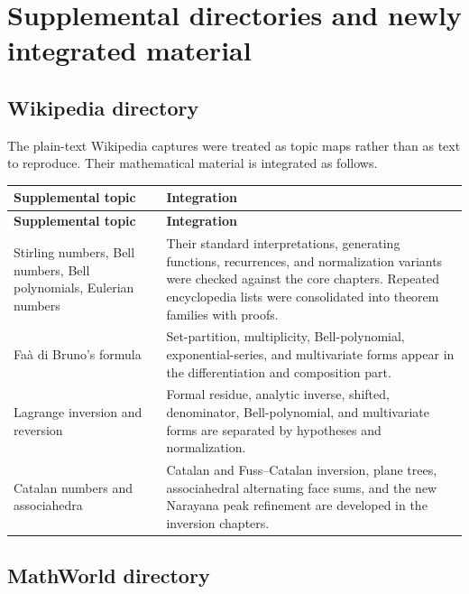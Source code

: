 \documentclass[11pt,a4paper,oneside,openany]{book}
\theoremstyle{definition}
\theoremstyle{remark}
\begin{document}
\chapter{Supplemental directories and newly integrated material}
\label{ch:supplemental-ledger}

\section{Wikipedia directory}

The plain-text Wikipedia captures were treated as topic maps rather than as
text to reproduce.  Their mathematical material is integrated as follows.

\begin{longtable}{>{\raggedright\arraybackslash}p{}
                  >{\raggedright\arraybackslash}p{}}
\toprule
\textbf{Supplemental topic} & \textbf{Integration}\\
\midrule
\endfirsthead
\toprule
\textbf{Supplemental topic} & \textbf{Integration}\\
\midrule
\endhead
\bottomrule
\endfoot
Stirling numbers, Bell numbers, Bell polynomials, Eulerian numbers
& Their standard interpretations, generating functions, recurrences, and
  normalization variants were checked against the core chapters.  Repeated
  encyclopedia lists were consolidated into theorem families with proofs.\\
Faà di Bruno's formula
& Set-partition, multiplicity, Bell-polynomial, exponential-series, and
  multivariate forms appear in the differentiation and composition part.\\
Lagrange inversion and reversion
& Formal residue, analytic inverse, shifted, denominator, Bell-polynomial, and
  multivariate forms are separated by hypotheses and normalization.\\
Catalan numbers and associahedra
& Catalan and Fuss--Catalan inversion, plane trees, associahedral alternating
  face sums, and the new Narayana peak refinement are developed in the
  inversion chapters.\\
\end{longtable}

\section{MathWorld directory}
\end{document}
